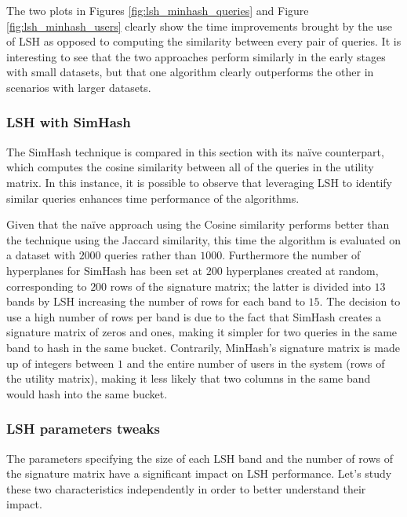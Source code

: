 The two plots in Figures \ref{fig:lsh_minhash_queries} and Figure \ref{fig:lsh_minhash_users} clearly show the time improvements brought by the use of LSH as opposed to computing the similarity between every pair of queries. It is interesting to see that the two approaches perform similarly in the early stages with small datasets, but that one algorithm clearly outperforms the other in scenarios with larger datasets. 





\subsubsection{LSH with SimHash}
The SimHash technique is compared in this section with its naïve counterpart, which computes the cosine similarity between all of the queries in the utility matrix. In this instance, it is possible to observe that leveraging LSH to identify similar queries enhances time performance of the algorithms. 

Given that the naïve approach using the Cosine similarity performs better than the technique using the Jaccard similarity, this time the algorithm is evaluated on a dataset with $2000$ queries rather than $1000$. Furthermore the number of hyperplanes for SimHash has been set at $200$ hyperplanes created at random, corresponding to $200$ rows of the signature matrix; the latter is divided into $13$ bands by LSH increasing the number of rows for each band to $15$. The decision to use a high number of rows per band is due to the fact that SimHash creates a signature matrix of zeros and ones, making it simpler for two queries in the same band to hash in the same bucket. Contrarily, MinHash's signature matrix is made up of integers between $1$ and the entire number of users in the system (rows of the utility matrix), making it less likely that two columns in the same band would hash into the same bucket. 





\subsubsection{LSH parameters tweaks} 
The parameters specifying the size of each LSH band and the number of rows of the signature matrix have a significant impact on LSH performance. Let's study these two characteristics independently in order to better understand their impact. 

